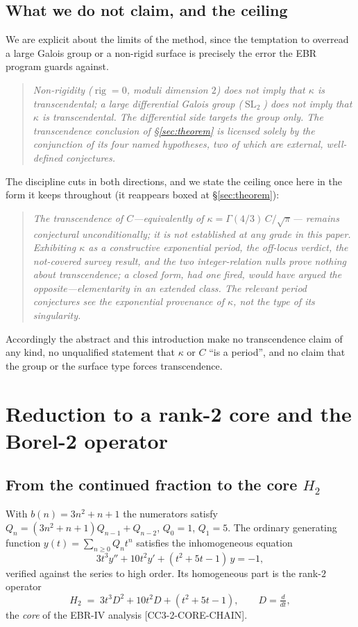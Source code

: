 \documentclass[11pt,reqno]{amsart}
\theoremstyle{plain}
\theoremstyle{definition}
\theoremstyle{remark}
\newcommand{\SL}{\operatorname{SL}}
\DeclareMathOperator{\rig}{rig}
\newcommand{\Htwo}{H_{2}}
\newcommand{\claim}[1]{\textsf{\small[#1]}}
\begin{document}
\subsection{What we do not claim, and the ceiling}\label{sec:nonclaim}
We are explicit about the limits of the method, since the temptation to
overread a large Galois group or a non-rigid surface is precisely the error the
EBR program guards against.
\begin{quote}\itshape
Non-rigidity ($\rig=0$, moduli dimension $2$) does not imply that $\kappa$ is
transcendental; a large differential Galois group ($\SL_{2}$) does not imply
that $\kappa$ is transcendental. The differential side targets the group only.
The transcendence conclusion of \S\ref{sec:theorem} is licensed solely by the
conjunction of its four named hypotheses, two of which are external,
well-defined conjectures.
\end{quote}
The discipline cuts in both directions, and we state the ceiling once here in
the form it keeps throughout (it reappears boxed at \S\ref{sec:theorem}):
\begin{quote}\itshape
The transcendence of $C$---equivalently of $\kappa=\Gamma(4/3)\,C/\sqrt{\pi}$---%
remains conjectural unconditionally; it is not established at any grade in this
paper. Exhibiting $\kappa$ as a constructive exponential period, the off-locus
verdict, the not-covered survey result, and the two integer-relation nulls
prove nothing about transcendence; a closed form, had one fired, would have
argued the opposite---elementarity in an extended class. The relevant period
conjectures see the exponential provenance of $\kappa$, not the type of its
singularity.
\end{quote}
Accordingly the abstract and this introduction make no transcendence claim of
any kind, no unqualified statement that $\kappa$ or $C$ ``is a period'', and no
claim that the group or the surface type forces transcendence.

\section{Reduction to a rank-2 core and the Borel-2 operator}\label{sec:reduction}

\subsection{From the continued fraction to the core $\Htwo$}
With $b(n)=3n^{2}+n+1$ the numerators satisfy
$Q_{n}=(3n^{2}+n+1)Q_{n-1}+Q_{n-2}$, $Q_{0}=1$, $Q_{1}=5$. The ordinary
generating function $y(t)=\sum_{n\ge0}Q_{n}t^{n}$ satisfies the inhomogeneous
equation
\begin{equation}\label{eq:ogf}
  3t^{3}y''+10t^{2}y'+(t^{2}+5t-1)\,y=-1,
\end{equation}
verified against the series to high order. Its homogeneous part is the rank-$2$
operator
\begin{equation}\label{eq:H2}
  \Htwo \;=\; 3t^{3}D^{2}+10t^{2}D+(t^{2}+5t-1),\qquad D=\tfrac{d}{dt},
\end{equation}
the \emph{core} of the EBR-IV analysis \claim{CC3-2-CORE-CHAIN}.
\end{document}
